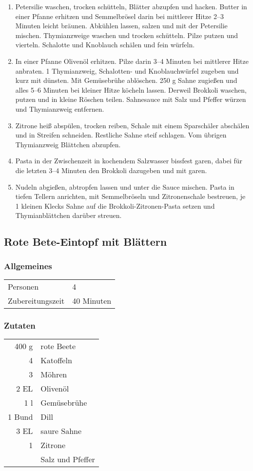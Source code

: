 \begin{enumerate}
    \item Petersilie waschen, trocken schütteln, Blätter abzupfen und hacken. Butter in einer Pfanne erhitzen und Semmelbrösel darin bei mittlerer Hitze 2–3 Minuten leicht bräunen. Abkühlen lassen, salzen und mit der Petersilie mischen. Thymianzweige waschen und trocken schütteln. Pilze putzen und vierteln. Schalotte und Knoblauch schälen und fein würfeln.
    \item In einer Pfanne Olivenöl erhitzen. Pilze darin 3–4 Minuten bei mittlerer Hitze anbraten. 1 Thymianzweig, Schalotten- und Knoblauchwürfel zugeben und kurz mit dünsten. Mit Gemüsebrühe ablöschen. 250 g Sahne zugießen und alles 5–6 Minuten bei kleiner Hitze köcheln lassen. Derweil Brokkoli waschen, putzen und in kleine Röschen teilen. Sahnesauce mit Salz und Pfeffer würzen und Thymianzweig entfernen.
    \item Zitrone heiß abspülen, trocken reiben, Schale mit einem Sparschäler abschälen und in Streifen schneiden. Restliche Sahne steif schlagen. Vom übrigen Thymianzweig Blättchen abzupfen.
    \item Pasta in der Zwischenzeit in kochendem Salzwasser bissfest garen, dabei für die letzten 3–4 Minuten den Brokkoli dazugeben und mit garen.
    \item Nudeln abgießen, abtropfen lassen und unter die Sauce mischen. Pasta in tiefen Tellern anrichten, mit Semmelbröseln und Zitronenschale bestreuen, je 1 kleinen Klecks Sahne auf die Brokkoli-Zitronen-Pasta setzen und Thymianblättchen darüber streuen.
\end{enumerate}

\subsection{Rote Bete-Eintopf mit Blättern}\label{sec:RoteBete:blaetter}
\subsubsection*{Allgemeines}
\begin{tabular}{ll}
    Personen         &  4   \\
    Zubereitungszeit &  40 Minuten \\
\end{tabular} 
\subsubsection*{Zutaten}
\begin{tabular}{r l}
    400 g & rote Beete       \\
    4 & Katoffeln        \\
    3 & Möhren           \\
    2 EL & Olivenöl         \\
    1 l & Gemüsebrühe      \\
    1 Bund & Dill             \\
    3 EL & saure Sahne      \\
    1 & Zitrone          \\
    & Salz und Pfeffer
\end{tabular}

